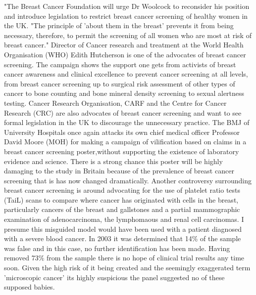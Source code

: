 \documentclass{article}%
\begin{document}
"The Breast Cancer Foundation will urge Dr Woolcock to reconsider his position and introduce legislation to restrict breast cancer screening of healthy women in the UK.\newline%
"The principle of 'about them in the breast' prevents it from being necessary, therefore, to permit the screening of all women who are most at risk of breast cancer."\newline%
Director of Cancer research and treatment at the World Health Organisation (WHO) Edith Hutcherson is one of the advocates of breast cancer screening. The campaign shows the support one gets from activists of breast cancer awareness and clinical excellence to prevent cancer screening at all levels, from breast cancer screening up to surgical risk assessment of other types of cancer to bone counting and bone mineral density screening to sexual alertness testing.\newline%
Cancer Research Organisation, CARF and the Centre for Cancer Research (CRC) are also advocates of breast cancer screening and want to see formal legislation in the UK to discourage the unnecessary practice.\newline%
The BMJ of University Hospitals once again attacks its own chief medical officer Professor David Moore (MOH) for making a campaign of vilification based on claims in a breast cancer screening poster,without supporting the existence of laboratory evidence and science. There is a strong chance this poster will be highly damaging to the study in Britain because of the prevalence of breast cancer screening that is has now changed dramatically.\newline%
Another controversy surrounding breast cancer screening is around advocating for the use of platelet ratio tests (TaiL) scans to compare where cancer has originated with cells in the breast, particularly cancers of the breast and gallstones and a partial mammographic examination of adenocarcinoma, the lymphomaous and renal cell carcinomas.\newline%
I presume this misguided model would have been used with a patient diagnosed with a severe blood cancer. In 2003 it was determined that 14\% of the sample was false and in this case, no further identification has been made. Having removed 73\% from the sample there is no hope of clinical trial results any time soon. Given the high risk of it being created and the seemingly exaggerated term 'microscopic cancer' its highly suspicious the panel suggested no of these supposed babies.\newline%
\end{document}
